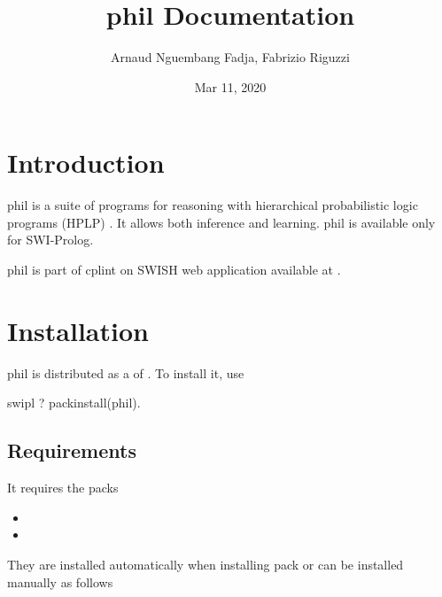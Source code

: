 \documentclass[letterpaper,10pt,english]{sphinxmanual}
\title{phil Documentation}
\date{Mar 11, 2020}
\author{Arnaud Nguembang Fadja, Fabrizio Riguzzi}
\begin{document}
\maketitle
\sphinxtableofcontents
{}\label{\detokenize{index::doc}}



\chapter{Introduction}
\label{\detokenize{index:phil-on-swish-manual-swi-prolog-version}}\label{\detokenize{index:introduction}}
phil is a suite of programs for reasoning with hierarchical probabilistic logic programs (HPLP) \label{\detokenize{index:id1}}{\hyperref[\detokenize{index:ngulamrig17-plp-iw}]{\sphinxcrossref{{[}NguembangFadjaLR17{]}}}}.
It allows both inference and learning. phil is available only for SWI-Prolog.

phil is part of cplint on SWISH web application available at .


\chapter{Installation}
\label{\detokenize{index:installation}}
phil is distributed as a  of .
To install it, use

%
\begin{sphinxVerbatim}[commandchars=\\\{\}]
\PYGZdl{} swipl
?\PYGZhy{} pack\PYGZus{}install(phil).
\end{sphinxVerbatim}


\section{Requirements}
\label{\detokenize{index:requirements}}
It requires the packs
\begin{itemize}
\item {} 

\item {} 

\end{itemize}

They are installed automatically when installing pack  or can be installed manually as follows
\end{document}
